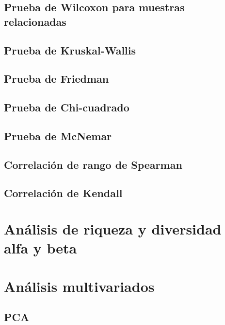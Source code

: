\documentclass[
]{book}
\begin{document}
\section{Prueba de Wilcoxon para muestras relacionadas}\label{prueba-de-wilcoxon-para-muestras-relacionadas}

\section{Prueba de Kruskal-Wallis}\label{prueba-de-kruskal-wallis}

\section{Prueba de Friedman}\label{prueba-de-friedman}

\section{Prueba de Chi-cuadrado}\label{prueba-de-chi-cuadrado}

\section{Prueba de McNemar}\label{prueba-de-mcnemar}

\section{Correlación de rango de Spearman}\label{correlaciuxf3n-de-rango-de-spearman}

\section{Correlación de Kendall}\label{correlaciuxf3n-de-kendall}

\chapter{Análisis de riqueza y diversidad alfa y beta}\label{anuxe1lisis-de-riqueza-y-diversidad-alfa-y-beta}

\chapter{Análisis multivariados}\label{anuxe1lisis-multivariados}

\section{PCA}\label{pca}
\end{document}
